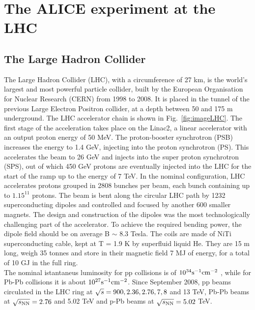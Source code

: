 \chapter{The ALICE experiment at the LHC}

\section{The Large Hadron Collider}
The Large Hadron Collider (LHC), with a circumference of 27 km, 
is the world's largest and most powerful particle collider, built by the 
European Organisation for Nuclear Research (CERN) from 1998 to 2008. 
It is placed in the tunnel of the previous Large Electron Positron collider, at a depth between 50 and 175 m underground.
The LHC accelerator chain is shown in Fig.~\ref{fig:imageLHC}. The first stage 
of the acceleration takes place on the Linac2, a linear accelerator with an 
output proton energy of 50 MeV. The proton-booster synchrotron (PSB) increases 
the energy to 1.4 GeV, injecting into the proton synchrotron (PS). This accelerates the
 beam to 26 GeV and injects into the super proton synchrotron (SPS), out of which 
 450 GeV protons are eventually injected into the LHC for the start of the ramp up to 
 the energy of 7 TeV. In the nominal configuration, LHC accelerates protons grouped in 2808 bunches per beam, each bunch 
 containing up to $1.15^{11}$ protons. The beam is bent along the circular LHC 
 path by 1232 superconducting dipoles and controlled and focused by another 
 600 smaller magnets. The design and construction of the dipoles was the most 
 technologically challenging part of the accelerator. To achieve the required bending power, 
 the dipole field should be on average B $\sim$ 8.3 Tesla. The coils are made of 
 NiTi superconducting cable, kept at T = 1.9 K by superfluid liquid He. They are 
 15 m long, weigh 35 tonnes and store in their magnetic field 7 MJ of energy, for a total of 10 GJ in the full ring.\\
The nominal istantaneus luminosity for pp collisions is of $10^{34} {\rm s}^{-1} {\rm cm}^{-2}$ , while for 
Pb-Pb collisions it is about $10^{27} {\rm s}^{-1} {\rm cm}^{-2}$. Since September 2008, pp
 beams circulated in the LHC ring at $\sqrt{s}=900, 2.36, 2.76, 7, 8$ and 13 TeV, 
 Pb-Pb beams at $\sqrt{s_{\rm NN}}=2.76$ and 5.02 TeV and p-Pb beams at $\sqrt{s_{\rm NN}}=5.02$ TeV.

